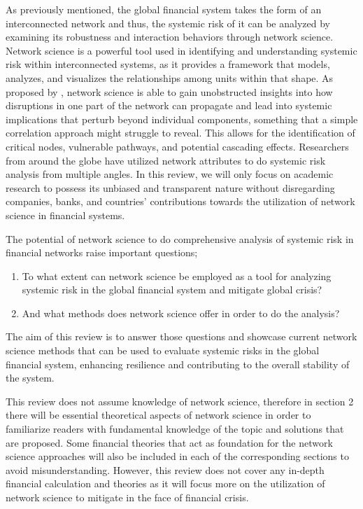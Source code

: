 \documentclass[a4paper,11pt]{article}
\begin{document}
As previously mentioned, the global financial system takes the form of an interconnected network and thus, the systemic risk of it can be analyzed by examining its robustness and interaction behaviors through network science. Network science is a powerful tool used in identifying and understanding systemic risk within interconnected systems, as it provides a framework that models, analyzes, and visualizes the relationships among units within that shape. As proposed by \cite{Patro_Qi_Sun_2013}, network science is able to gain unobstructed insights into how disruptions in one part of the network can propagate and lead into systemic implications that perturb beyond individual components, something that a simple correlation approach might struggle to reveal. This allows for the identification of critical nodes, vulnerable pathways, and potential cascading effects. Researchers from around the globe have utilized network attributes to do systemic risk analysis from multiple angles. In this review, we will only focus on academic research  to possess  its unbiased and transparent nature without disregarding companies, banks, and countries’ contributions towards the utilization of network science in financial systems.

The potential of network science to do comprehensive analysis of systemic risk in financial networks raise important questions;
\begin{enumerate}
    \item To what extent can network science be employed as a tool for analyzing systemic risk in the global financial system and mitigate global crisis? 
    \item And what methods does network science offer in order to do the analysis? 
\end{enumerate}
The aim of this review is to answer those questions and showcase current network science methods that can be used to evaluate systemic risks in the global financial system, enhancing resilience and contributing to the overall stability of the system.

This review does not assume knowledge of network science, therefore in section 2 there will be essential theoretical aspects of network science in order to familiarize readers with fundamental knowledge of the topic and solutions that are proposed. Some financial theories that act as foundation for the network science approaches will also be included in each of the corresponding sections to avoid misunderstanding. However, this review does not cover any in-depth financial calculation and theories as it will focus more on the utilization of network science to mitigate in the face of financial crisis.
\end{document}
